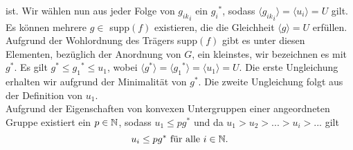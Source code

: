 {ist.
%
%
%
%
%
%
%
%
%
%
%
%
%
%
%
%
%
%
%
%
Wir wählen nun aus jeder Folge von ${g_{ik}}_i$ ein ${g_i}^*$, sodass $\langle {g_{ik}}_i\rangle = \langle u_i \rangle =  U$ gilt.
Es können mehrere $g\in$ supp$(f)$ existieren, die die Gleichheit $\langle g\rangle = U$ erfüllen. Aufgrund der Wohlordnung des Trägers supp$(f)$ gibt es unter diesen Elementen, bezüglich der Anordnung von $G$, ein kleinstes, wir bezeichnen es mit $g^*$. 
Es gilt $g^* \leq {g_1}^* \leq u_1$, wobei $\langle g^*\rangle = \langle {g_1}^* \rangle = \langle u_1\rangle = U$. Die erste Ungleichung erhalten wir aufgrund der Minimalität von $g^*$. Die zweite Ungleichung folgt aus der Definition von $u_1$. \\
%
%
%
%
%
Aufgrund der Eigenschaften von konvexen Untergruppen einer angeordneten Gruppe existiert ein $p \in \mathbb{N}$, sodass $u_1 \le pg^*$ und da $u_1 > u_2 > ... > u_i > ...$ gilt 
\[u_i \le pg^*\text{ für alle }i \in \mathbb{N}.\] 

}
